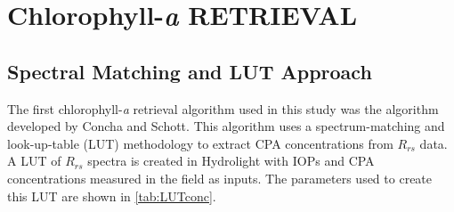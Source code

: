 \documentclass[]{spie}  %
\begin{document}
\section{Chlorophyll-{\it a} RETRIEVAL}
\subsection{Spectral Matching and LUT Approach}
The first chlorophyll-{\it a} retrieval algorithm used in this study was the algorithm developed by Concha and Schott\cite{Concha2013IGARSS}. This algorithm uses a spectrum-matching and look-up-table (LUT) methodology to extract CPA concentrations from $R_{rs}$ data. A LUT of $R_{rs}$ spectra is created in Hydrolight\cite{MobleyHE} with IOPs and CPA concentrations measured in the field as inputs. The parameters used to create this LUT are shown in \autoref{tab:LUTconc}.
\end{document}
